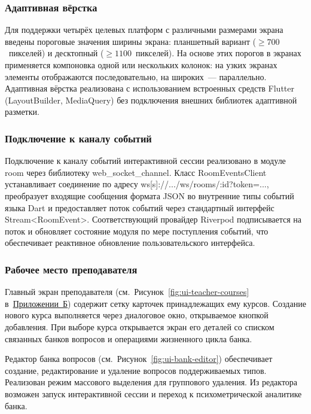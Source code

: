 \subsubsection{Адаптивная вёрстка}

Для поддержки четырёх целевых платформ с различными размерами
экрана введены пороговые значения ширины экрана: планшетный
вариант ($\geq 700$~пикселей) и десктопный
($\geq 1100$~пикселей). На основе этих порогов в экранах
применяется компоновка одной или нескольких колонок: на узких
экранах элементы отображаются последовательно, на широких~---
параллельно. Адаптивная вёрстка реализована с использованием
встроенных средств Flutter (LayoutBuilder,
MediaQuery) без подключения внешних библиотек
адаптивной разметки.

\subsubsection{Подключение к каналу событий}

Подключение к каналу событий интерактивной сессии реализовано
в модуле room через библиотеку web\_socket\_channel.
Класс RoomEventsClient устанавливает соединение по
адресу ws[s]://.../ws/rooms/:id?token=..., преобразует
входящие сообщения формата JSON во внутренние типы событий
языка Dart и предоставляет поток событий через стандартный
интерфейс Stream<RoomEvent>. Соответствующий провайдер
Riverpod подписывается на поток и обновляет состояние модуля
по мере поступления событий, что обеспечивает реактивное
обновление пользовательского интерфейса.

\subsubsection{Рабочее место преподавателя}

Главный экран преподавателя (см.~Рисунок~\ref{fig:ui-teacher-courses}
в~\hyperref[application_B]{Приложении~Б}) содержит сетку карточек принадлежащих ему курсов.
Создание нового курса выполняется через диалоговое окно, открываемое
кнопкой добавления. При выборе курса открывается экран его
деталей со списком связанных банков вопросов и операциями
жизненного цикла банка.

Редактор банка вопросов (см.~Рисунок~\ref{fig:ui-bank-editor})
обеспечивает создание, редактирование и удаление вопросов
поддерживаемых типов. Реализован режим массового выделения для
группового удаления. Из редактора возможен запуск интерактивной
сессии и переход к психометрической аналитике банка.

